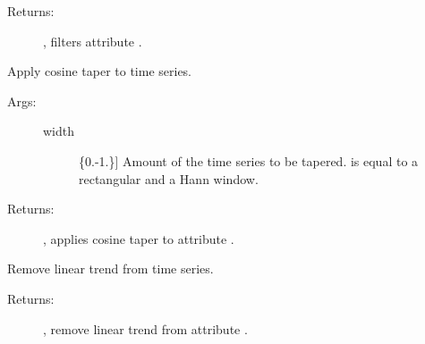 \documentclass[letterpaper,10pt,english,openany,oneside]{sphinxmanual}
\begin{document}
\begin{fulllineitems}
\begin{fulllineitems}
\begin{description}
\item[{Returns:}] \leavevmode
{}, filters attribute .

\end{description}

\end{fulllineitems}


\begin{fulllineitems}
\label{\detokenize{index:sigpropy.TimeSeries.cosine_taper}}
Apply cosine taper to time series.
\begin{description}
\item[{Args:}] \leavevmode\begin{description}
\item[{width}] \leavevmode{[}\{0.-1.\}{]}
Amount of the time series to be tapered.
 is equal to a rectangular and  a Hann window.

\end{description}

\item[{Returns:}] \leavevmode
{}, applies cosine taper to attribute .

\end{description}

\end{fulllineitems}


\begin{fulllineitems}
\label{\detokenize{index:sigpropy.TimeSeries.detrend}}
Remove linear trend from time series.
\begin{description}
\item[{Returns:}] \leavevmode
{}, remove linear trend from attribute .

\end{description}

\end{fulllineitems}



\end{fulllineitems}
\end{document}

